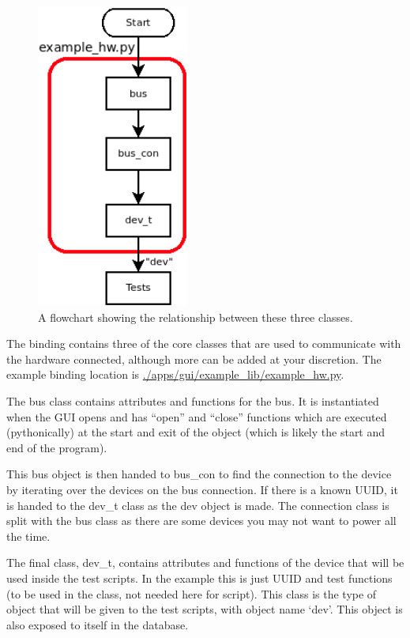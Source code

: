 \documentclass[a4paper,12pt, notitlepage]{article}
\begin{document}
{{{{{{{{{{{\begin{figure}
	\centering
	\includegraphics[width=50mm]{Images/examplehw.png}
	\caption{\small A flowchart showing the relationship between these three classes.}
	\label{fig: examplehw}
\end{figure}

The binding contains three of the core classes that are used to communicate with the hardware connected, although more can be added at your discretion. The example binding location is \url{./apps/gui/example_lib/example_hw.py}.

The bus class contains attributes and functions for the bus. It is instantiated when the GUI opens and has “open” and “close” functions which are executed (pythonically) at the start and exit of the object (which is likely the start and end of the program).

This bus object is then handed to bus\_con to find the connection to the device by iterating over the devices on the bus connection. If there is a known UUID, it is handed to the dev\_t class as the dev object is made. The connection class is split with the bus class as there are some devices you may not want to power all the time.

The final class, dev\_t, contains attributes and functions of the device that will be used inside the test scripts. In the example this is just UUID and test functions (to be used in the class, not needed here for script). This class is the type of object that will be given to the test scripts, with object name `dev'. This object is also exposed to itself in the database. 

}}}}}}}}}}}
\end{document}
